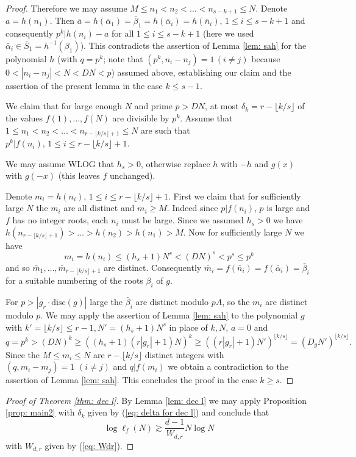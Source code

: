 \documentclass[alphabetic]{amsart}
\theoremstyle{definition}
\numberwithin{equation}{section}
\newcommand{\case}[1]{\vspace{0.3cm}\noindent\framebox{#1.}}
\newcommand{\disc}{{\mathrm{disc}}}
\numberwithin{equation}{section}
\begin{document}
\begin{proof}
Therefore we may assume $M\le n_1<n_2<\ldots<n_{s-k+1}\le N$. 
Denote $a=h(n_1)$. Then $\bar a=h(\bar \alpha_1)=\bar\beta_1=h(\bar \alpha_i)=h(\bar n_i),\,1\le i\le s-k+1$ and consequently $p^k|h(n_i)-a$ for all $1\le i\le s-k+1$ (here we used $\bar\alpha_i\in\bar S_1=h^{-1}(\beta_1)$). This contradicts the assertion of Lemma \ref{lem: sah} for the polynomial $h$ (with $q=p^k$; note that $(p^k,n_i-n_j)=1\,(i\neq j)$ because $0<|n_i-n_j|<N<DN<p$) assumed above, establishing our claim and the assertion of the present lemma in the case $k\le s-1$. 

\case{$k\ge s$} We claim that for large enough $N$ and prime $p>DN$, at most $\delta_k=r-\lfloor k/s\rfloor$ of the values $f(1),\ldots,f(N)$ are divisible by $p^k$. 
Assume that $1\le n_1<n_2<\ldots<n_{r-\lfloor k/s\rfloor+1}\le N$ are such that $p^k|f(n_i),\,1\le i\le r-\lfloor k/s\rfloor+1$. 

We may assume WLOG that $h_s>0$, otherwise replace $h$ with $-h$ and $g(x)$ with $g(-x)$ (this leaves $f$ unchanged).

Denote $m_i=h(n_i),\,1\le i\le r-\lfloor k/s\rfloor+1$. First we claim that for sufficiently large $N$ the $m_i$ are all distinct and $m_i\ge M$. Indeed since $p|f(n_i)$, $p$ is large and $f$ has no integer roots, each $n_i$ must be large. Since we assumed $h_s>0$ we have $h(n_{r-\lfloor k/s\rfloor+1})>\ldots>h(n_2)>h(n_1)>M$.
Now for sufficiently large $N$ we have $$m_i=h(n_i)\le (h_s+1)N^s<(DN)^s<p^s\le p^k$$ and so $\bar m_1,\ldots,\bar m_{r-\lfloor k/s\rfloor+1}$ are distinct. Consequently $\bar m_i=f(\bar n_i)=f(\bar\alpha_i)=\bar\beta_i$ for a suitable numbering of the roots $\beta_i$ of $g$. 

For $p>|g_r\cdot\disc(g)|$ large the $\bar\beta_i$ are distinct modulo $pA$, so the $m_i$ are distinct modulo $p$. We may apply the assertion of Lemma \ref{lem: sah} to the polynomial $g$ with $k'=\lfloor k/s\rfloor\le r-1, N'=(h_s+1)N^s$ in place of $k,N$, $a=0$ and 
$$q=p^k> (DN)^k\ge\left((h_s+1)(r|g_r|+1)N\right)^{k}\ge ((r|g_r|+1)N')^{\lfloor k/s\rfloor}=(D_gN')^{\lfloor k/s\rfloor}.$$
Since the $M\le m_i\le N$ are $r-\lfloor k/s\rfloor$ distinct integers with $(q,m_i-m_j)=1\,\,(i\neq j)$ and $q|f(m_i)$ we obtain a contradiction to the assertion of Lemma \ref{lem: sah}. This concludes the proof in the case $k\ge s$.

\end{proof}

\begin{proof}[Proof of Theorem \ref{thm: dec l}]
By Lemma \ref{lem: dec l} we may apply Proposition \ref{prop: main2} with $\delta_k$ given by (\ref{eq: delta for dec l}) and conclude that
$$\log \ell_f(N)\gtrsim \frac{d-1}{W_{d,r}}N\log N$$ with $W_{d,r}$ given by (\ref{eq: Wdr}).
\end{proof}
\end{document}
